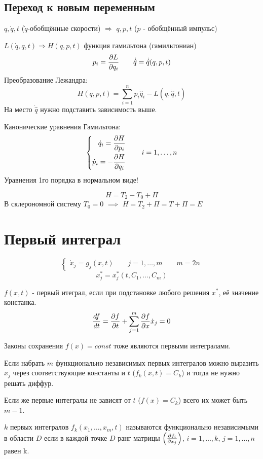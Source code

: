 \documentclass{article}
\begin{document}
\subsection{Переход к новым переменным}
$q,\dot{q},t$ ($\dot{q}$-обобщённые скорости) $\Rightarrow$ $q,p,t$ ($p$ - обобщённый импульс)

$L(\dot{q},q,t) \Rightarrow H(q,p,t)$ функция гамильтона (гамильтониан)
\[
  p_i=\frac{\partial{L}}{\partial{q_i}} \qquad \dot{\hat{q}}=\dot{\hat{q}}(q,p,t)
\]
Преобразование Лежандра:
\[
  H(q,p,t)=\sum_{i=1}^{n}p_i \dot{\hat{q}}_i - L(q, \dot{\hat q},t)
\]
На место $\dot{\hat q}$ нужно подставить зависимость выше.

Канонические уравнения Гамильтона:
\[
  \left\{\begin{aligned}
    \dot{q}_i=\frac{\partial{H}}{\partial{p_i}} \\ 
    \dot{p}_i=-\frac{\partial{H}}{\partial{q_i}}
  \end{aligned}\right. \qquad i=1,\dots ,n
\]
Уравнения 1го порядка в нормальном виде!

\[
  H=T_2-T_0+\Pi
\]
В склерономной систему $T_0=0$ $\implies$ $H=T_2+\Pi=T+\Pi=E$


\section{Первый интеграл}
\[
  \left\{\begin{aligned}
    \dot{x}_j=g_j(x,t) \qquad j=1,\dots ,m \qquad m=2n
  \end{aligned}\right.
\]
\[
  x_j^{*}=x_{j}^{*}(t,C_1,\dots ,C_m)
\]
\begin{definition}
  $f(x,t)$ - первый итеграл, если при подстановке любого решения $x^{*}$,
  её значение констанка.
  \[
    \frac{df}{dt}=\frac{\partial{f}}{\partial{t}}+\sum_{j=1}^{m}\frac{\partial{f}}{\partial{x}}\dot{x}_j=0
  \]
\end{definition}
Законы сохранения $f(x)=const$ тоже являются первыми интегралами.

Если набрать $m$ функционально независимых первых интегралов можно выразить $x_j$
через соответствующие константы и $t$ ($f_k(x,t)=C_k$)
и тогда не нужно решать диффур.

Если же первые интегралы не зависят от $t$ ($f(x)=C_k$)
всего их может быть $m-1$.
\begin{definition}
  $k$ первых интегралов $f_k(x_1,\dots ,x_m,t)$ называются функционально
  независимыми в области $D$ если в каждой точке $D$ ранг матрицы
  $\left(\frac{\partial{f_i}}{\partial{x_j}}\right)$, $i=1,\dots, k$, $j=1,\dots ,n$
  равен k.
\end{definition}
\end{document}
